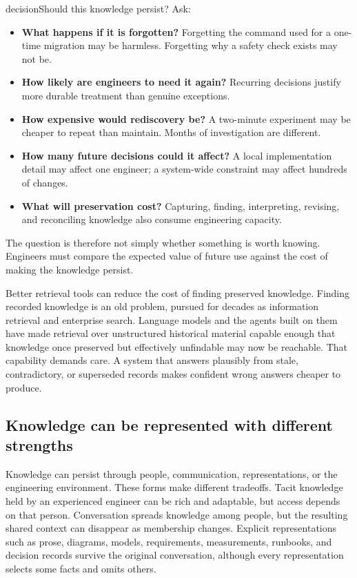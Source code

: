 \begin{bookbox}{decision}{Should this knowledge persist?} %
Ask:

\begin{itemize}
\tightlist
\item
  \textbf{What happens if it is forgotten?} Forgetting the command used for a one-time migration may be
  harmless. Forgetting why a safety check exists may not be.
\item
  \textbf{How likely are engineers to need it again?} Recurring decisions justify more durable treatment
  than genuine exceptions.
\item
  \textbf{How expensive would rediscovery be?} A two-minute experiment may be cheaper to repeat than
  maintain. Months of investigation are different.
\item
  \textbf{How many future decisions could it affect?} A local implementation detail may affect one
  engineer; a system-wide constraint may affect hundreds of changes.
\item
  \textbf{What will preservation cost?} Capturing, finding, interpreting, revising, and reconciling
  knowledge also consume engineering capacity.
\end{itemize}
\end{bookbox}

The question is therefore not simply whether something is worth knowing. Engineers must compare the
expected value of future use against the cost of making the knowledge persist.

Better retrieval tools can reduce the cost of finding preserved knowledge. Finding recorded
knowledge is an old problem, pursued for decades as information retrieval and enterprise search. Language models and the agents built on
them have made retrieval over unstructured historical material capable enough that knowledge once
preserved but effectively unfindable may now be reachable. That capability demands care. A system
that answers plausibly from stale, contradictory, or superseded records makes confident wrong
answers cheaper to produce.

\subsection{Knowledge can be represented with different strengths}\label{sec-representation-forms}

Knowledge can persist through people, communication, representations, or the engineering
environment. These forms make different tradeoffs. Tacit knowledge held by an experienced engineer
can be rich and adaptable, but access depends on that person. Conversation spreads knowledge among
people, but the resulting shared context can disappear as membership changes. Explicit
representations such as prose, diagrams, models, requirements, measurements, runbooks, and decision
records survive the original conversation, although every representation selects some facts and
omits others.

